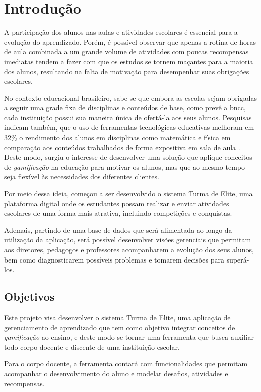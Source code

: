 \chapter[Introdução]{Introdução}
A participação dos alunos nas aulas e atividades escolares é essencial para a evolução do aprendizado. Porém, é possível observar que apenas a rotina de horas de aula combinada a um grande volume de atividades com poucas recompensas imediatas tendem a fazer com que os estudos se tornem maçantes para a maioria dos alunos, resultando na falta de motivação para desempenhar suas obrigações escolares.


No contexto educacional brasileiro, sabe-se que embora as escolas sejam obrigadas a seguir uma grade fixa de disciplinas e conteúdos de base, como prevê a \ac{bncc}, cada instituição possui sua maneira única de ofertá-la aos seus alunos. Pesquisas indicam também, que o uso de ferramentas tecnológicas educativas melhoram em 32\% o rendimento dos alunos em disciplinas como matemática e física em comparação aos conteúdos trabalhados de forma expositiva em sala de aula \cite{estudotec:2013}. Deste modo, surgiu o interesse de desenvolver uma solução que aplique conceitos de \textit{gamificação} na educação para motivar os alunos, mas que ao mesmo tempo seja flexível às necessidades dos diferentes clientes. 

Por meio dessa ideia, começou a ser desenvolvido o sistema Turma de Elite, uma plataforma digital onde os estudantes possam realizar e enviar atividades escolares de uma forma mais atrativa, incluindo competições e conquistas.

Ademais, partindo de uma base de dados que será alimentada ao longo da utilização da aplicação, será possível desenvolver visões gerenciais que permitam aos diretores, pedagogos e professores acompanharem a evolução dos seus alunos, bem como diagnosticarem possíveis problemas e tomarem decisões para superá-los.


\section{Objetivos}
Este projeto visa desenvolver o sistema Turma de Elite, uma aplicação de gerenciamento de aprendizado que tem como objetivo integrar conceitos de \textit{gamificação} ao ensino, e deste modo se tornar uma ferramenta que busca auxiliar todo corpo docente e discente de uma instituição escolar.


Para o corpo docente, a ferramenta contará com funcionalidades que permitam acompanhar o desenvolvimento do aluno e modelar desafios, atividades e recompensas.


